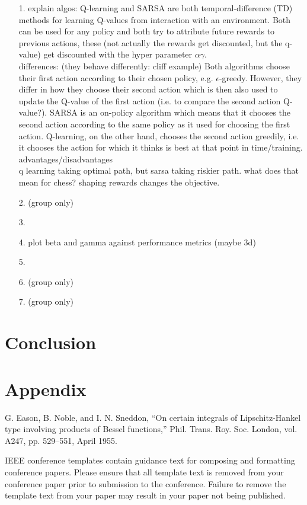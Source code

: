 \documentclass[conference]{IEEEtran}
\begin{document}
\begin{itemize}
    \item[1.] explain algos: Q-learning and SARSA are both temporal-difference (TD) methods for learning Q-values from interaction with an environment. Both can be used for any policy and both try to attribute future rewards to previous actions, these (not actually the rewards get discounted, but the q-value) get discounted with the hyper parameter $\alpha\gamma$. \\
    differences: (they behave differently: cliff example) Both algorithms choose their first action according to their chosen policy, e.g. $\epsilon$-greedy. However, they differ in how they choose their second action which is then also used to update the Q-value of the first action (i.e. to compare the second action Q-value?). SARSA is an on-policy algorithm which means that it chooses the second action according to the same policy as it used for choosing the first action. Q-learning, on the other hand, chooses the second action greedily, i.e. it chooses the action for which it thinks is best at that point in time/training. \\
    advantages/disadvantages \\
    q learning taking optimal path, but sarsa taking riskier path. what does that mean for chess?
    shaping rewards changes the objective.

    \item[2. (group only)]
    \item[3.]
    \item[4.]  plot beta and gamma against performance metrics (maybe 3d)
    \item[5.] 
    \item[6. (group only)] 
    \item[7. (group only)] 
\end{itemize}


\section{Conclusion}



\section{Appendix}



\begin{thebibliography}{00}

    \color{red}
     G. Eason, B. Noble, and I. N. Sneddon, ``On certain integrals of Lipschitz-Hankel type involving products of Bessel functions,'' Phil. Trans. Roy. Soc. London, vol. A247, pp. 529--551, April 1955.
\end{thebibliography}
\color{red}
\vspace{12pt}
IEEE conference templates contain guidance text for composing and formatting conference papers. Please ensure that all template text is removed from your conference paper prior to submission to the conference. Failure to remove the template text from your paper may result in your paper not being published.
\end{document}
